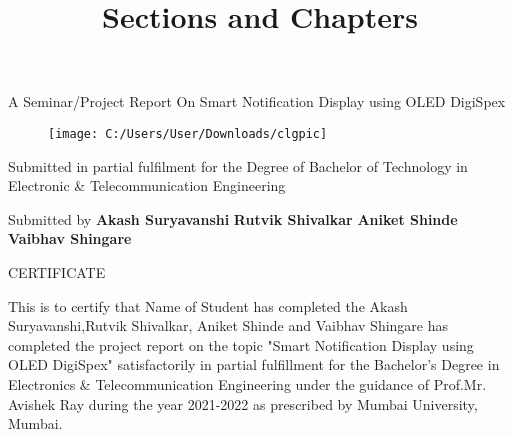 \documentclass[12pt,a4paper,final,oneside]{report}
\title{Sections and Chapters}
\begin{document}
	
	
	
	
	
	\begin{center}
		A Seminar/Project Report On
		\linebreak \LARGE{Smart Notification Display 
		} 
		\linebreak \LARGE{using OLED DigiSpex}
	\end{center}
	\vspace{2cm}
	\begin{figure}[t]
		\centering
		\texttt{[image: C:/Users/User/Downloads/clgpic]}
	\end{figure}
	\vspace{1cm}
	\begin{center}
		Submitted in partial fulfilment for the 
		\linebreak Degree of Bachelor of Technology in 
		\linebreak Electronic \& Telecommunication Engineering 
	\end{center}
	\vspace{2cm}
	\begin{center}
		Submitted by
		\linebreak \textbf{Akash Suryavanshi }
		\linebreak \textbf{Rutvik Shivalkar}
		\linebreak \textbf{Aniket  Shinde}
		\linebreak \textbf{Vaibhav Shingare}
		\vspace{2cm}
	\end{center}
	
	
	
	\newpage	
	
	\begin{center}
		\LARGE{CERTIFICATE}
	\end{center}
	
	
	\vspace{2cm}
	
	This is to certify that Name of Student has completed the Akash Suryavanshi,Rutvik Shivalkar, Aniket  Shinde and Vaibhav Shingare has completed the project report on the topic "Smart Notification Display using OLED DigiSpex" satisfactorily in partial fulfillment for the Bachelor's Degree in Electronics \& Telecommunication Engineering under the guidance of Prof.Mr. Avishek Ray during the year 2021-2022 as prescribed by Mumbai University, Mumbai.
	
	\vspace{3cm}
	
\end{document}
